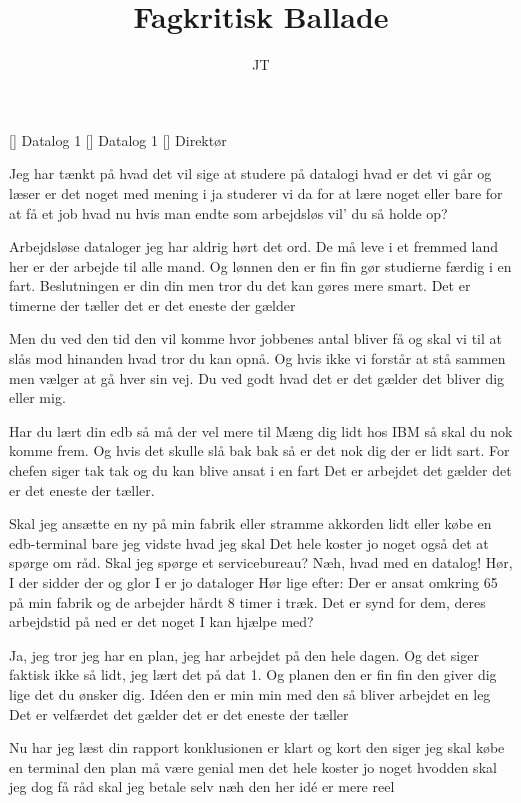 \documentclass[a4paper,11pt]{article}
\title{Fagkritisk Ballade}
\author{JT}
\begin{document}
\maketitle

\begin{roles}
  [] Datalog 1
  [] Datalog 1
  [] Direktør
\end{roles}

\begin{song}
Jeg har tænkt på hvad det vil sige
at studere på datalogi
hvad er det vi går og læser
er det noget med mening i
ja studerer vi da for at lære noget
eller bare for at få et job
hvad nu hvis man endte som arbejdsløs
vil' du så holde op?

Arbejdsløse dataloger
jeg har aldrig hørt det ord.
De må leve i et fremmed land
her er der arbejde til alle mand.
Og lønnen den er fin fin
gør studierne færdig i en fart.
Beslutningen er din din
men tror du det kan gøres mere smart.
Det er timerne der tæller
det er det eneste der gælder

Men du ved den tid den vil komme
hvor jobbenes antal bliver få
og skal vi til at slås mod hinanden
hvad tror du kan opnå.
Og hvis ikke vi forstår at stå sammen
men vælger at gå hver sin vej.
Du ved godt hvad det er det gælder
det bliver dig eller mig.

Har du lært din edb
så må der vel mere til
Mæng dig lidt hos IBM
så skal du nok komme frem.
Og hvis det skulle slå bak bak
så er det nok dig der er lidt sart.
For chefen siger tak tak
og du kan blive ansat i en fart
Det er arbejdet det gælder
det er det eneste der tæller.

Skal jeg ansætte en ny på min fabrik
eller stramme akkorden lidt
eller købe en edb-terminal
bare jeg vidste hvad jeg skal
Det hele koster jo noget
også det at spørge om råd.
Skal jeg spørge et servicebureau?
Næh, hvad med en datalog!
Hør, I der sidder der og glor
I er jo dataloger
Hør lige efter:
Der er ansat omkring 65 på min fabrik
og de arbejder hårdt 8 timer i træk.
Det er synd for dem, deres arbejdstid på ned
er det noget I kan hjælpe med?

Ja, jeg tror jeg har en plan,
jeg har arbejdet på den hele dagen.
Og det siger faktisk ikke så lidt,
jeg lært det på dat 1.
Og planen den er fin fin
den giver dig lige det du ønsker dig.
Idéen den er min min
med den så bliver arbejdet en leg
Det er velfærdet det gælder
det er det eneste der tæller

Nu har jeg læst din rapport
konklusionen er klart og kort
den siger jeg skal købe en terminal
den plan må være genial
men det hele koster jo noget
hvodden skal jeg dog få råd
skal jeg betale selv
næh den her idé er mere reel


\end{song}
\end{document}
